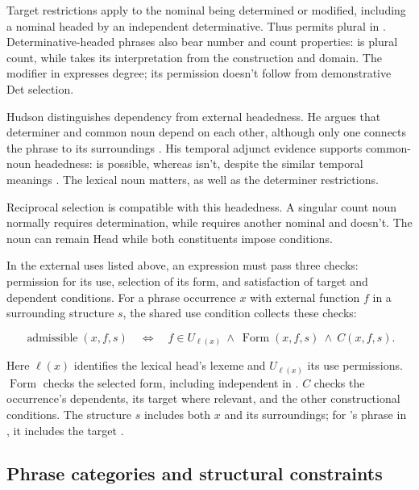 \documentclass[12pt]{article}
\begin{document}
Target restrictions apply to the nominal being determined or modified, including a nominal headed by an independent determinative. Thus  permits plural  in . Determinative-headed phrases also bear number and count properties:  is plural count, while  takes its interpretation from the construction and domain. The modifier  in  expresses degree; its permission doesn't follow from demonstrative Det selection.

Hudson distinguishes dependency from external headedness. He argues that determiner and common noun depend on each other, although only one connects the phrase to its surroundings \citep[7--8]{hudson2004determiners}. His temporal adjunct evidence supports common-noun headedness:  is possible, whereas  isn't, despite the similar temporal meanings \citep[10--12]{hudson2004determiners}. The lexical noun matters, as well as the determiner restrictions.

Reciprocal selection is compatible with this headedness. A singular count noun normally requires determination, while  requires another nominal and  doesn't. The noun can remain Head while both constituents impose conditions.

In the external uses listed above, an expression must pass three checks: permission for its use, selection of its form, and satisfaction of target and dependent conditions. For a phrase occurrence $x$ with external function $f$ in a surrounding structure $s$, the shared use condition collects these checks:

\[
\operatorname{admissible}(x,f,s)
\quad\Longleftrightarrow\quad
f\in U_{\ell(x)}\ \land\ \operatorname{Form}(x,f,s)\ \land\ C(x,f,s).
\]

Here $\ell(x)$ identifies the lexical head's lexeme and $U_{\ell(x)}$ its use permissions. $\operatorname{Form}$ checks the selected form, including independent  in . $C$ checks the occurrence's dependents, its target where relevant, and the other constructional conditions. The structure $s$ includes both $x$ and its surroundings; for 's phrase in , it includes the target .

\subsection{Phrase categories and structural constraints}\label{sec:det-uniform}
\end{document}
